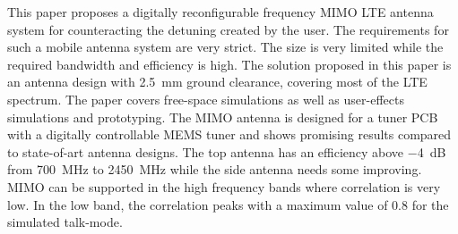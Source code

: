 This paper proposes a digitally reconfigurable frequency MIMO LTE antenna system for counteracting the detuning created by the user. The requirements for such a mobile antenna system are very strict. The size is very limited while the required bandwidth and efficiency is high. The solution proposed in this paper is an antenna design with \SI{2.5}{mm} ground clearance, covering most of the LTE spectrum. 
The paper covers free-space simulations as well as user-effects simulations and prototyping. The MIMO antenna is designed for a tuner PCB with a digitally controllable MEMS tuner and shows promising results compared to state-of-art antenna designs. The top antenna has an efficiency above \SI{-4}{dB} from \SI{700}{MHz} to \SI{2450}{MHz} while the side antenna needs some improving. 
MIMO can be supported in the high frequency bands where correlation is very low. In the low band, the correlation peaks with a maximum value of \num{0.8} for the simulated talk-mode.
